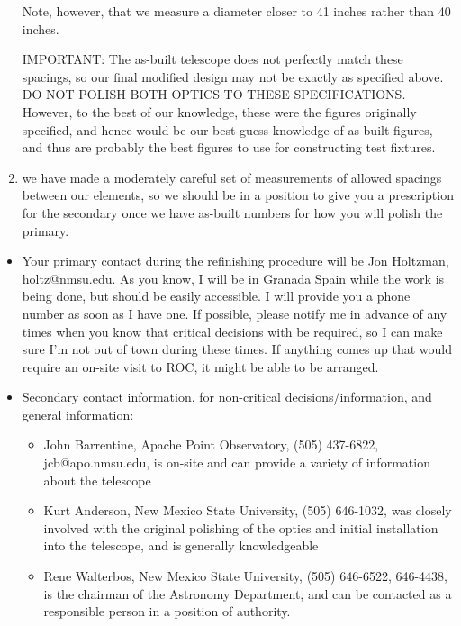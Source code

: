 \documentclass{letter}
\begin{document}
\begin{letter}
\begin{enumerate}
   Note, however, that we measure a diameter closer to 41 inches rather
   than 40 inches.

   IMPORTANT: The as-built telescope does not perfectly match these
   spacings, so our final modified design may not be exactly as specified
   above.  DO NOT POLISH BOTH OPTICS TO THESE SPECIFICATIONS.
   However, to the best of our knowledge, these were the figures
   originally specified, and hence would be our best-guess knowledge of
   as-built figures, and thus are probably the best figures to use for
   constructing test fixtures.

  \item we have made a moderately careful set of measurements of allowed
    spacings between our elements, so we should be in a position to
    give you a prescription for the secondary once we have as-built
    numbers for how you will polish the primary. 
\end{enumerate}

\begin{itemize}
  \item Your primary contact during the refinishing procedure will be
    Jon Holtzman, holtz@nmsu.edu. As you know, I will be in Granada Spain
    while the work is being done, but should be easily accessible. I will
    provide you a phone number as soon as I have one. If possible, please
    notify me in advance of any times when you know that critical decisions
    with be required, so I can make sure I'm not out of town during these
    times. If anything comes up that would require an on-site visit to
    ROC, it might be able to be arranged.

  \item Secondary contact information, for non-critical decisions/information,
    and general information:
\begin{itemize}
    \item John Barrentine, Apache Point Observatory, (505) 437-6822, 
    jcb@apo.nmsu.edu, is on-site and can provide a variety of information
    about the telescope

    \item Kurt Anderson, New Mexico State University, (505) 646-1032, was
    closely involved with the original polishing of the optics and initial
    installation into the telescope, and is generally knowledgeable

    \item Rene Walterbos, New Mexico State University, (505) 646-6522, 646-4438,
    is the chairman of the Astronomy Department, and can be contacted as
    a responsible person in a position of authority.
\end{itemize}
\end{itemize}


\end{letter}
\end{document}
